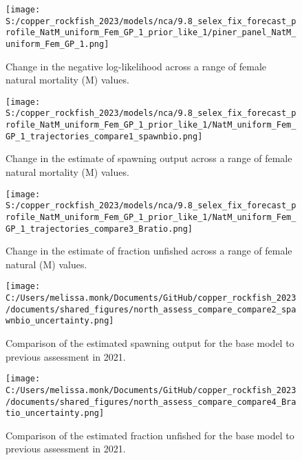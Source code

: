 \documentclass[11pt,
  english,
  letterpaper,
]{article}
\begin{document}
\pagebreak

\begin{figure}
\centering
\texttt{[image: S:/copper\_rockfish\_2023/models/nca/9.8\_selex\_fix\_forecast\_profile\_NatM\_uniform\_Fem\_GP\_1\_prior\_like\_1/piner\_panel\_NatM\_uniform\_Fem\_GP\_1.png]}
\caption{Change in the negative log-likelihood across a range of female natural mortality (M) values.\label{fig:m-profile}}
\end{figure}

\pagebreak

\begin{figure}
\centering
\texttt{[image: S:/copper\_rockfish\_2023/models/nca/9.8\_selex\_fix\_forecast\_profile\_NatM\_uniform\_Fem\_GP\_1\_prior\_like\_1/NatM\_uniform\_Fem\_GP\_1\_trajectories\_compare1\_spawnbio.png]}
\caption{Change in the estimate of spawning output across a range of female natural mortality (M) values.\label{fig:m-ssb}}
\end{figure}

\pagebreak

\begin{figure}
\centering
\texttt{[image: S:/copper\_rockfish\_2023/models/nca/9.8\_selex\_fix\_forecast\_profile\_NatM\_uniform\_Fem\_GP\_1\_prior\_like\_1/NatM\_uniform\_Fem\_GP\_1\_trajectories\_compare3\_Bratio.png]}
\caption{Change in the estimate of fraction unfished across a range of female natural (M) values.\label{fig:m-depl}}
\end{figure}

\begin{figure}
\centering
\texttt{[image: C:/Users/melissa.monk/Documents/GitHub/copper\_rockfish\_2023/documents/shared\_figures/north\_assess\_compare\_compare2\_spawnbio\_uncertainty.png]}
\caption{Comparison of the estimated spawning output for the base model to previous assessment in 2021.\label{fig:comp-assess-sb}}
\end{figure}

\newpage

\begin{figure}
\centering
\texttt{[image: C:/Users/melissa.monk/Documents/GitHub/copper\_rockfish\_2023/documents/shared\_figures/north\_assess\_compare\_compare4\_Bratio\_uncertainty.png]}
\caption{Comparison of the estimated fraction unfished for the base model to previous assessment in 2021.\label{fig:comp-assess-depl}}
\end{figure}
\end{document}
